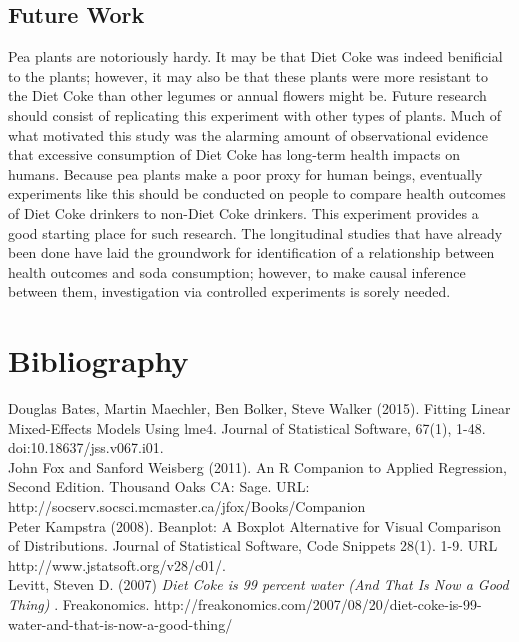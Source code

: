 \documentclass[1p,12pt]{elsarticle}\usepackage[]{graphicx}\usepackage[]{color}
\begin{document}
\subsection{Future Work}
Pea plants are notoriously hardy. It may be that Diet Coke was indeed benificial to the plants; however, it may also be that these plants were more resistant to the Diet Coke than other legumes or annual flowers might be. Future research should consist of replicating this experiment with other types of plants.  Much of what motivated this study was the alarming amount of observational evidence that excessive consumption of Diet Coke has long-term health impacts on humans. Because pea plants make a poor proxy for human beings, eventually experiments like this should be conducted on people to compare health outcomes of Diet Coke drinkers to non-Diet Coke drinkers. This experiment provides a good starting place for such research.  The longitudinal studies that have already been done have laid the groundwork for identification of a relationship between health outcomes and soda consumption; however, to make causal inference between them, investigation via controlled experiments is sorely needed. 



\newpage

\section{Bibliography}

  Douglas Bates, Martin Maechler, Ben Bolker, Steve Walker (2015). Fitting Linear Mixed-Effects Models Using lme4. Journal of Statistical Software, 67(1), 1-48. doi:10.18637/jss.v067.i01.
~ \\ 

John Fox and Sanford Weisberg (2011). An {R} Companion to Applied Regression, Second Edition. Thousand Oaks CA: Sage. URL:  \\http://socserv.socsci.mcmaster.ca/jfox/Books/Companion
~\\

Peter Kampstra (2008). Beanplot: A Boxplot Alternative for Visual Comparison of Distributions. Journal of Statistical Software, Code Snippets 28(1). 1-9. URL http://www.jstatsoft.org/v28/c01/.
~ \\ 


Levitt, Steven D. (2007) \textit{Diet Coke is 99 percent water (And That Is Now a Good Thing) }. Freakonomics. http://freakonomics.com/2007/08/20/diet-coke-is-99-water-and-that-is-now-a-good-thing/
~\\
\end{document}
